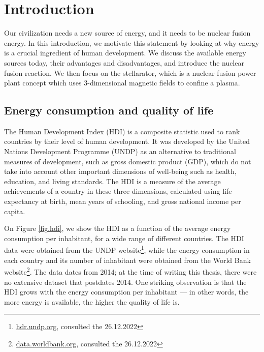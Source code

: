 \documentclass[my_thesis.tex]{subfiles}
\begin{document}
\cleardoublepage
\chapter{Introduction}
 

Our civilization needs a new source of energy, and it needs to be nuclear fusion energy. In this introduction, we motivate this statement by looking at why energy is a crucial ingredient of human development. We discuss the available energy sources today, their advantages and disadvantages, and introduce the nuclear fusion reaction. We then focus on the stellarator, which is a nuclear fusion power plant concept which uses 3-dimensional magnetic fields to confine a plasma.

\section{Energy consumption and quality of life}

The Human Development Index (HDI)  \citep{undpunitednationsdevelopmentprogrammeHumanDevelopmentReport1990} is a composite statistic used to rank countries by their level of human development. It was developed by the United Nations Development Programme (UNDP) as an alternative to traditional measures of development, such as gross domestic product (GDP), which do not take into account other important dimensions of well-being such as health, education, and living standards. The HDI is a measure of the average achievements of a country in these three dimensions, calculated using life expectancy at birth, mean years of schooling, and gross national income per capita.

On Figure \ref{fig.hdi}, we show the HDI as a function of the average energy consumption per inhabitant, for a wide range of different countries. The HDI data were obtained from the UNDP website\footnote{\url{hdr.undp.org}, consulted the 26.12.2022}, while the energy consumption in each country and its number of inhabitant were obtained from the World Bank website\footnote{\url{data.worldbank.org}, consulted the 26.12.2022}. The data dates from 2014; at the time of writing this thesis, there were no extensive dataset that postdates 2014. One striking observation is that the HDI grows with the energy consumption per inhabitant --- in other words, the more energy is available, the higher the quality of life is.
\end{document}
